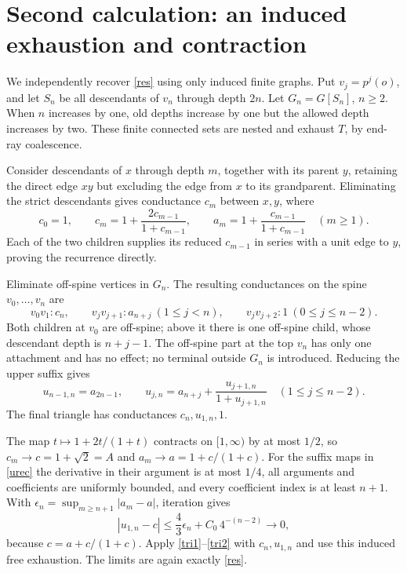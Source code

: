 \documentclass[11pt]{article}
\theoremstyle{remark}\newtheorem{remark}[theorem]{Remark}
\begin{document}
\section{Second calculation: an induced exhaustion and contraction}
We independently recover \eqref{res} using only induced finite graphs.
Put \(v_j=p^j(o)\), and let \(S_n\) be all descendants of \(v_n\)
through depth \(2n\). Let \(G_n=G[S_n]\), \(n\ge2\).
When \(n\) increases by one, old depths increase by one but the allowed
depth increases by two. These finite connected sets are nested and
exhaust \(T\), by end-ray coalescence.

Consider descendants of \(x\) through depth \(m\), together with its
parent \(y\), retaining the direct edge \(xy\) but excluding the edge
from \(x\) to its grandparent. Eliminating the strict descendants gives
conductance \(c_m\) between \(x,y\), where
\begin{equation}\label{crec}
 c_0=1,\qquad c_m=1+\frac{2c_{m-1}}{1+c_{m-1}},
 \qquad a_m=1+\frac{c_{m-1}}{1+c_{m-1}}\quad(m\ge1).
\end{equation}
Each of the two children supplies its reduced \(c_{m-1}\) in series
with a unit edge to \(y\), proving the recurrence directly.

Eliminate off-spine vertices in \(G_n\).
The resulting conductances on the spine \(v_0,\ldots,v_n\) are
\[
 v_0v_1:c_n,\qquad v_jv_{j+1}:a_{n+j}\ (1\le j<n),
 \qquad v_jv_{j+2}:1\ (0\le j\le n-2).
\]
Both children at \(v_0\) are off-spine; above it there is one off-spine
child, whose descendant depth is \(n+j-1\).
The off-spine part at the top \(v_n\) has only one attachment and has no
effect; no terminal outside \(G_n\) is introduced.
Reducing the upper suffix gives
\begin{equation}\label{urec}
 u_{n-1,n}=a_{2n-1},\qquad
 u_{j,n}=a_{n+j}+\frac{u_{j+1,n}}{1+u_{j+1,n}}
       \quad(1\le j\le n-2).
\end{equation}
The final triangle has conductances \(c_n,u_{1,n},1\).

The map \(t\mapsto1+2t/(1+t)\) contracts on \([1,\infty)\) by at most
\(1/2\), so \(c_m\to c=1+\sqrt2=A\) and
\(a_m\to a=1+c/(1+c)\).
For the suffix maps in \eqref{urec} the derivative in their argument
is at most \(1/4\), all arguments and coefficients are uniformly bounded,
and every coefficient index is at least \(n+1\).
With \(\epsilon_n=\sup_{m\ge n+1}|a_m-a|\), iteration gives
\[
 |u_{1,n}-c|
 \le \frac43\epsilon_n+C_0\,4^{-(n-2)}\longrightarrow0,
\]
because \(c=a+c/(1+c)\). Apply \eqref{tri1}--\eqref{tri2} with
\(c_n,u_{1,n}\) and use this induced free exhaustion.
The limits are again exactly \eqref{res}.
\end{document}
